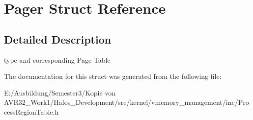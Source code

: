 \hypertarget{struct_pager}{
\section{Pager Struct Reference}
\label{struct_pager}
}


\subsection{Detailed Description}
type and corresponding Page Table 

The documentation for this struct was generated from the following file:\begin{CompactItemize}
\item 
E:/Ausbildung/Semester3/Kopie von AVR32\_\-Work1/Halos\_\-Development/src/kernel/vmemory\_\-management/inc/ProcessRegionTable.h\end{CompactItemize}
